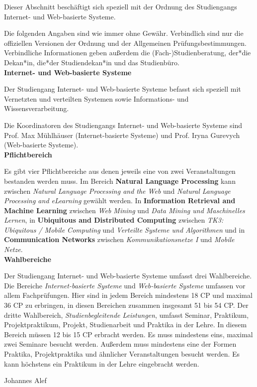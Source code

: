 {Dieser Abschnitt beschäftigt sich speziell mit der Ordnung des Studiengangs Internet- und Web-basierte Systeme.
}{
    Die folgenden Angaben sind wie immer ohne Gewähr. Verbindlich sind nur die offiziellen Versionen der Ordnung und der Allgemeinen Prüfungsbestimmungen. Verbindliche Informationen geben außerdem die (Fach-)Studienberatung, der*die Dekan*in, die*der Studiendekan*in und das Studienbüro.\\

    \noindent\textbf{Internet- und Web-basierte Systeme}

    Der Studiengang Internet- und Web-basierte Systeme befasst sich speziell mit Vernetzten und verteilten Systemen sowie Informations- und Wissensverarbeitung.

    Die Koordinatoren des Studiengangs Internet- und Web-basierte Systeme sind Prof. Max Mühlhäuser (Internet-basierte Systeme) und Prof. Iryna Gurevych (Web-basierte Systeme).\\

    \noindent\textbf{Pflichtbereich}

    Es gibt vier Pflichtbereiche aus denen jeweils eine von zwei Veranstaltungen bestanden werden muss. Im Bereich \textbf{Natural Language Processing} kann zwischen \textit{Natural Language Processing and the Web} und \textit{Natural Language Processing and eLearning} gewählt werden. In \textbf{Information Retrieval and Machine Learning} zwischen \textit{Web Mining} und \textit{Data Mining und Maschinelles Lernen}, in \textbf{Ubiquitous and Distributed Computing} zwischen \textit{TK3: Ubiquitous / Mobile Computing} und \textit{Verteilte Systeme und Algorithmen} und in \textbf{Communication Networks} zwischen \textit{Kommunikationsnetze I} und \textit{Mobile Netze}.\\

    \noindent\textbf{Wahlbereiche}

    Der Studiengang Internet- und Web-basierte Systeme umfasst drei Wahlbereiche. Die Bereiche \textit{Internet-basierte Systeme} und \textit{Web-basierte Systeme} umfassen vor allem Fachprüfungen. Hier sind in jedem Bereich mindestens 18 CP und maximal 36 CP zu erbringen, in diesen Bereichen zusammen insgesamt 51 bis 54 CP. Der dritte Wahlbereich, \textit{Studienbegleitende Leistungen}, umfasst Seminar, Praktikum, Projektpraktikum, Projekt, Studienarbeit und Praktika in der Lehre. In diesem Bereich müssen 12 bis 15 CP erbracht werden. Es muss mindestens eins, maximal zwei Seminare besucht werden. Außerdem muss mindestens eine der Formen Praktika, Projektpraktika und ähnlicher Veranstaltungen besucht werden. Es kann höchstens ein Praktikum in der Lehre eingebracht werden.\\
}
{Johannes Alef}
